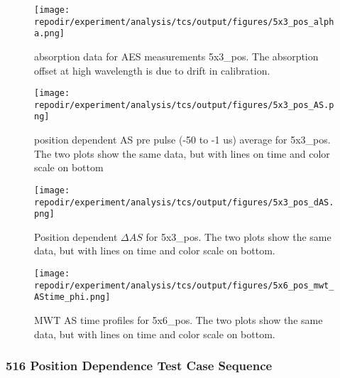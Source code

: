 \begin{figure}[]
\centering
\texttt{[image: \\repodir/experiment/analysis/tcs/output/figures/5x3\_pos\_alpha.png]}
\caption{absorption data for AES measurements 5x3\_pos. The absorption offset at high wavelength is due to drift in calibration.}
\label{fig:SI_5x3_pos_alpha}
\end{figure}






\begin{figure}[]
\centering
\texttt{[image: \\repodir/experiment/analysis/tcs/output/figures/5x3\_pos\_AS.png]}
\caption{position dependent AS pre pulse (-50 to -1 us) average for 5x3\_pos. The two plots show the same data, but with lines on time and color scale on bottom}
\label{fig:SI_5x3_pos_AS}
\end{figure}


\begin{figure}[]
    \centering
    \texttt{[image: \\repodir/experiment/analysis/tcs/output/figures/5x3\_pos\_dAS.png]} 
    \caption{Position dependent $\Delta AS$ for 5x3\_pos. The two plots show the same data, but with lines on time and color scale on bottom. }
    \label{fig:SI_5x3_pos_dAS}
\end{figure}


\begin{figure}[]
\centering
\texttt{[image: \\repodir/experiment/analysis/tcs/output/figures/5x6\_pos\_mwt\_AStime\_phi.png]}
\caption{MWT AS time profiles for 5x6\_pos. The two plots show the same data, but with lines on time and color scale on bottom.}
\label{fig:SI_5x6_pos_mwt_AStime_phi}
\end{figure}


\clearpage
\subsubsection{516 Position Dependence Test Case Sequence}

